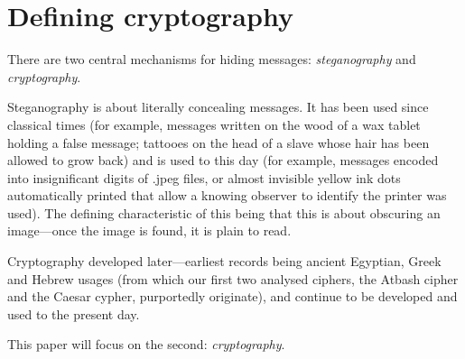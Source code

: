 \documentclass{AIAA}
\begin{document}
\section{Defining cryptography}
There are two central mechanisms for hiding messages: \textit{steganography} and \textit{cryptography}. 

Steganography is about literally concealing messages. It has been used since classical times (for example, messages written on the wood of a wax tablet holding a false message; tattooes on the head of a slave whose hair has been allowed to grow back) and is used to this day (for example, messages encoded into insignificant digits of .jpeg files, or almost invisible yellow ink dots automatically printed that allow a knowing observer to identify the printer was used). The defining characteristic of this being that this is about obscuring an image---once the image is found, it is plain to read.

Cryptography developed later---earliest records being ancient Egyptian, Greek and Hebrew usages (from which our first two analysed ciphers, the Atbash cipher and the Caesar cypher, purportedly originate), and continue to be developed and used to the present day. 

This paper will focus on the second: \textit{cryptography}.
\end{document}
